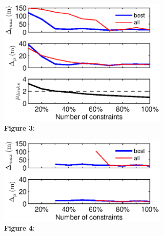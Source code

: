\documentclass[12pt,double]{article}
\begin{document}

\clearpage
\noindent\includegraphics[width=20pc]{Figure3_c.eps} \\
\textbf{Figure 3:} 


\clearpage
\noindent\includegraphics[width=20pc]{Figure4_c.eps} \\
\textbf{Figure 4:} 

\end{document}
